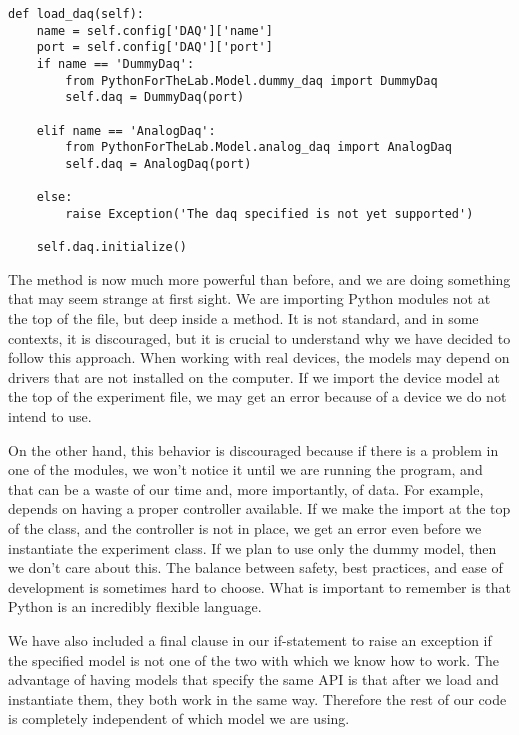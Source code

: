 \begin{verbatim}
def load_daq(self):
    name = self.config['DAQ']['name']
    port = self.config['DAQ']['port']
    if name == 'DummyDaq':
        from PythonForTheLab.Model.dummy_daq import DummyDaq
        self.daq = DummyDaq(port)

    elif name == 'AnalogDaq':
        from PythonForTheLab.Model.analog_daq import AnalogDaq
        self.daq = AnalogDaq(port)

    else:
        raise Exception('The daq specified is not yet supported')

    self.daq.initialize()
\end{verbatim}

The  method is now much more powerful than before, and we are doing something that may seem strange at first sight. We are importing Python modules not at the top of the file, but deep inside a method. It is not standard, and in some contexts, it is discouraged, but it is crucial to understand why we have decided to follow this approach. When working with real devices, the models may depend on drivers that are not installed on the computer. If we import the device model at the top of the experiment file, we may get an error because of a device we do not intend to use.

On the other hand, this behavior is discouraged because if there is a problem in one of the modules, we won't notice it until we are running the program, and that can be a waste of our time and, more importantly, of data. For example,  depends on having a proper controller available. If we make the import at the top of the class, and the controller is not in place, we get an error even before we instantiate the experiment class. If we plan to use only the dummy model, then we don't care about this. The balance between safety, best practices, and ease of development is sometimes hard to choose. What is important to remember is that Python is an incredibly flexible language.

We have also included a final clause in our if-statement to raise an exception if the specified model is not one of the two with which we know how to work. The advantage of having models that specify the same API is that after we load and instantiate them, they both work in the same way. Therefore the rest of our code is completely independent of which model we are using.


